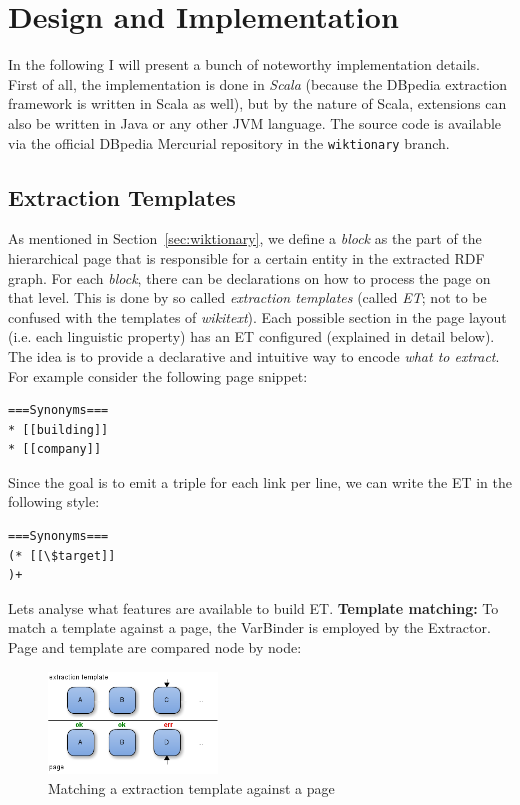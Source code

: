 \section{Design and Implementation}
\label{sec:implementation}
In the following I will present a bunch of noteworthy implementation details. First of all, the implementation is done in \textit{Scala} (because the DBpedia extraction framework is written in Scala as well), but by the nature of Scala, extensions can also be written in Java or any other JVM language. 
The source code is available via the official DBpedia Mercurial repository in the \texttt{wiktionary} branch.

\subsection{Extraction Templates}\label{sec:extpl}
As mentioned in Section~\ref{sec:wiktionary}, we define a \textit{block} as the part of the hierarchical page that is responsible for a certain entity in the extracted RDF graph. 
For each \textit{block}, there can be declarations on how to process the page on that level.
This is done by so called \textit{extraction templates} (called \textit{ET}; not to be confused with the templates of \textit{wikitext}).
Each possible section in the \wik page layout (i.e. each linguistic property) has an ET configured (explained in detail below). 
The idea is to provide a declarative and intuitive way to encode \textit{what to extract}.
For example consider the following page snippet:
\begin{lstlisting}[style=wikitext]
===Synonyms===
* [[building]]
* [[company]]
\end{lstlisting}
Since the goal is to emit a triple for each link per line, we can write the ET in the following style:
\begin{lstlisting}
===Synonyms===
(* [[\$target]]
)+
\end{lstlisting}
Lets analyse what features are available to build ET.\newline
\textbf{Template matching:}
To match a template against a page, the VarBinder is employed by the Extractor. Page and template are compared node by node:
\begin{figure}[h]
\centering
\includegraphics[width=0.4\textwidth]{../images/matching}
\caption{Matching a extraction template against a page}
\label{fig:matching}
\end{figure}
